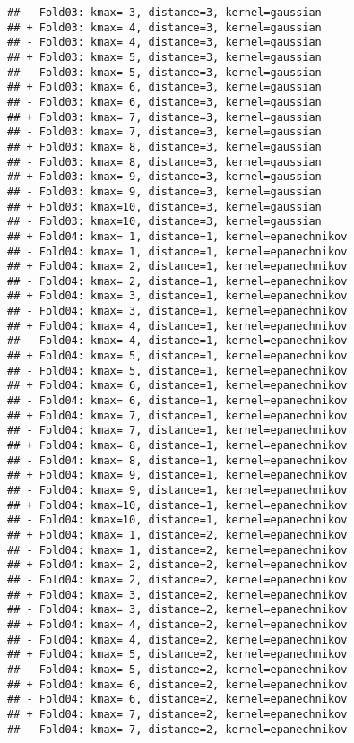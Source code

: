 \documentclass[
]{article}
\begin{document}
\begin{verbatim}
## - Fold03: kmax= 3, distance=3, kernel=gaussian 
## + Fold03: kmax= 4, distance=3, kernel=gaussian 
## - Fold03: kmax= 4, distance=3, kernel=gaussian 
## + Fold03: kmax= 5, distance=3, kernel=gaussian 
## - Fold03: kmax= 5, distance=3, kernel=gaussian 
## + Fold03: kmax= 6, distance=3, kernel=gaussian 
## - Fold03: kmax= 6, distance=3, kernel=gaussian 
## + Fold03: kmax= 7, distance=3, kernel=gaussian 
## - Fold03: kmax= 7, distance=3, kernel=gaussian 
## + Fold03: kmax= 8, distance=3, kernel=gaussian 
## - Fold03: kmax= 8, distance=3, kernel=gaussian 
## + Fold03: kmax= 9, distance=3, kernel=gaussian 
## - Fold03: kmax= 9, distance=3, kernel=gaussian 
## + Fold03: kmax=10, distance=3, kernel=gaussian 
## - Fold03: kmax=10, distance=3, kernel=gaussian 
## + Fold04: kmax= 1, distance=1, kernel=epanechnikov 
## - Fold04: kmax= 1, distance=1, kernel=epanechnikov 
## + Fold04: kmax= 2, distance=1, kernel=epanechnikov 
## - Fold04: kmax= 2, distance=1, kernel=epanechnikov 
## + Fold04: kmax= 3, distance=1, kernel=epanechnikov 
## - Fold04: kmax= 3, distance=1, kernel=epanechnikov 
## + Fold04: kmax= 4, distance=1, kernel=epanechnikov 
## - Fold04: kmax= 4, distance=1, kernel=epanechnikov 
## + Fold04: kmax= 5, distance=1, kernel=epanechnikov 
## - Fold04: kmax= 5, distance=1, kernel=epanechnikov 
## + Fold04: kmax= 6, distance=1, kernel=epanechnikov 
## - Fold04: kmax= 6, distance=1, kernel=epanechnikov 
## + Fold04: kmax= 7, distance=1, kernel=epanechnikov 
## - Fold04: kmax= 7, distance=1, kernel=epanechnikov 
## + Fold04: kmax= 8, distance=1, kernel=epanechnikov 
## - Fold04: kmax= 8, distance=1, kernel=epanechnikov 
## + Fold04: kmax= 9, distance=1, kernel=epanechnikov 
## - Fold04: kmax= 9, distance=1, kernel=epanechnikov 
## + Fold04: kmax=10, distance=1, kernel=epanechnikov 
## - Fold04: kmax=10, distance=1, kernel=epanechnikov 
## + Fold04: kmax= 1, distance=2, kernel=epanechnikov 
## - Fold04: kmax= 1, distance=2, kernel=epanechnikov 
## + Fold04: kmax= 2, distance=2, kernel=epanechnikov 
## - Fold04: kmax= 2, distance=2, kernel=epanechnikov 
## + Fold04: kmax= 3, distance=2, kernel=epanechnikov 
## - Fold04: kmax= 3, distance=2, kernel=epanechnikov 
## + Fold04: kmax= 4, distance=2, kernel=epanechnikov 
## - Fold04: kmax= 4, distance=2, kernel=epanechnikov 
## + Fold04: kmax= 5, distance=2, kernel=epanechnikov 
## - Fold04: kmax= 5, distance=2, kernel=epanechnikov 
## + Fold04: kmax= 6, distance=2, kernel=epanechnikov 
## - Fold04: kmax= 6, distance=2, kernel=epanechnikov 
## + Fold04: kmax= 7, distance=2, kernel=epanechnikov 
## - Fold04: kmax= 7, distance=2, kernel=epanechnikov 

\end{verbatim}
\end{document}
